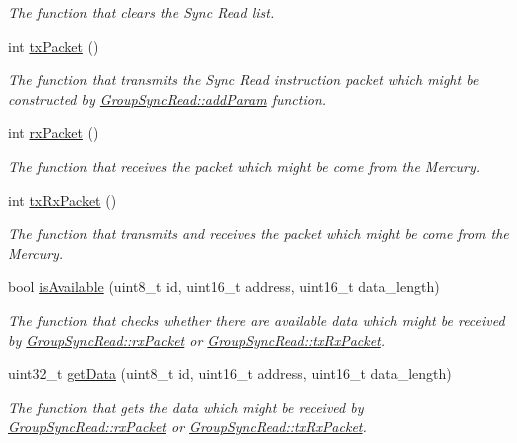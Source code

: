 \begin{DoxyCompactItemize}
\begin{DoxyCompactList}\small\item\em The function that clears the Sync Read list. \end{DoxyCompactList}\item 
int \hyperlink{classmercury_1_1_group_sync_read_aff47d20571c0a74b523b67b84106b5ad}{tx\+Packet} ()
\begin{DoxyCompactList}\small\item\em The function that transmits the Sync Read instruction packet which might be constructed by \hyperlink{classmercury_1_1_group_sync_read_ae71f56583201a641f461cf6c05935b35}{Group\+Sync\+Read\+::add\+Param} function. \end{DoxyCompactList}\item 
int \hyperlink{classmercury_1_1_group_sync_read_a3a8ddc22092e3abb293cc1c00622bce6}{rx\+Packet} ()
\begin{DoxyCompactList}\small\item\em The function that receives the packet which might be come from the Mercury. \end{DoxyCompactList}\item 
int \hyperlink{classmercury_1_1_group_sync_read_afe02414ad53e3fd021cda88cd9bf078b}{tx\+Rx\+Packet} ()
\begin{DoxyCompactList}\small\item\em The function that transmits and receives the packet which might be come from the Mercury. \end{DoxyCompactList}\item 
bool \hyperlink{classmercury_1_1_group_sync_read_ac50a1abb5d3c22932784cbe2f5ebd275}{is\+Available} (uint8\+\_\+t id, uint16\+\_\+t address, uint16\+\_\+t data\+\_\+length)
\begin{DoxyCompactList}\small\item\em The function that checks whether there are available data which might be received by \hyperlink{classmercury_1_1_group_sync_read_a3a8ddc22092e3abb293cc1c00622bce6}{Group\+Sync\+Read\+::rx\+Packet} or \hyperlink{classmercury_1_1_group_sync_read_afe02414ad53e3fd021cda88cd9bf078b}{Group\+Sync\+Read\+::tx\+Rx\+Packet}. \end{DoxyCompactList}\item 
uint32\+\_\+t \hyperlink{classmercury_1_1_group_sync_read_a9823bb189260acab7c522dcc99d32f5a}{get\+Data} (uint8\+\_\+t id, uint16\+\_\+t address, uint16\+\_\+t data\+\_\+length)
\begin{DoxyCompactList}\small\item\em The function that gets the data which might be received by \hyperlink{classmercury_1_1_group_sync_read_a3a8ddc22092e3abb293cc1c00622bce6}{Group\+Sync\+Read\+::rx\+Packet} or \hyperlink{classmercury_1_1_group_sync_read_afe02414ad53e3fd021cda88cd9bf078b}{Group\+Sync\+Read\+::tx\+Rx\+Packet}. \end{DoxyCompactList}\end{DoxyCompactItemize}


